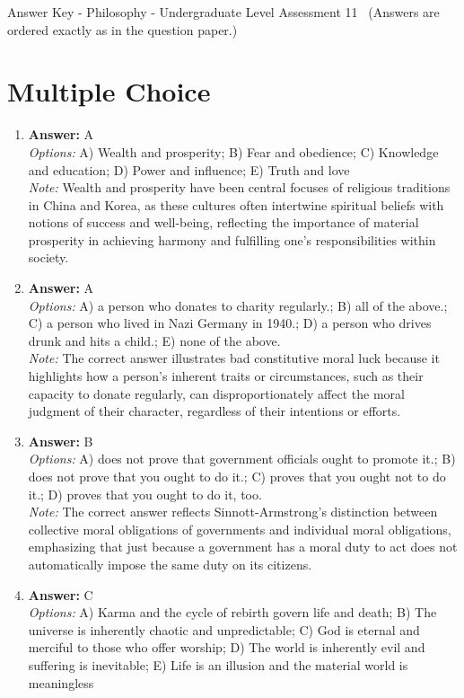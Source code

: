 \documentclass[12pt]{article}
\begin{document}
\begin{center}
Answer Key - Philosophy - Undergraduate Level Assessment 11 \
\small (Answers are ordered exactly as in the question paper.)
\end{center}

\section*{Multiple Choice}
\begin{enumerate}[label=\arabic*.]
\item \textbf{Answer:} A
\\ \textit{Options:} A) Wealth and prosperity; B) Fear and obedience; C) Knowledge and education; D) Power and influence; E) Truth and love
\\ \textit{Note:} Wealth and prosperity have been central focuses of religious traditions in China and Korea, as these cultures often intertwine spiritual beliefs with notions of success and well-being, reflecting the importance of material prosperity in achieving harmony and fulfilling one's responsibilities within society.
\item \textbf{Answer:} A
\\ \textit{Options:} A) a person who donates to charity regularly.; B) all of the above.; C) a person who lived in Nazi Germany in 1940.; D) a person who drives drunk and hits a child.; E) none of the above.
\\ \textit{Note:} The correct answer illustrates bad constitutive moral luck because it highlights how a person's inherent traits or circumstances, such as their capacity to donate regularly, can disproportionately affect the moral judgment of their character, regardless of their intentions or efforts.
\item \textbf{Answer:} B
\\ \textit{Options:} A) does not prove that government officials ought to promote it.; B) does not prove that you ought to do it.; C) proves that you ought not to do it.; D) proves that you ought to do it, too.
\\ \textit{Note:} The correct answer reflects Sinnott-Armstrong's distinction between collective moral obligations of governments and individual moral obligations, emphasizing that just because a government has a moral duty to act does not automatically impose the same duty on its citizens.
\item \textbf{Answer:} C
\\ \textit{Options:} A) Karma and the cycle of rebirth govern life and death; B) The universe is inherently chaotic and unpredictable; C) God is eternal and merciful to those who offer worship; D) The world is inherently evil and suffering is inevitable; E) Life is an illusion and the material world is meaningless

\end{enumerate}
\end{document}
